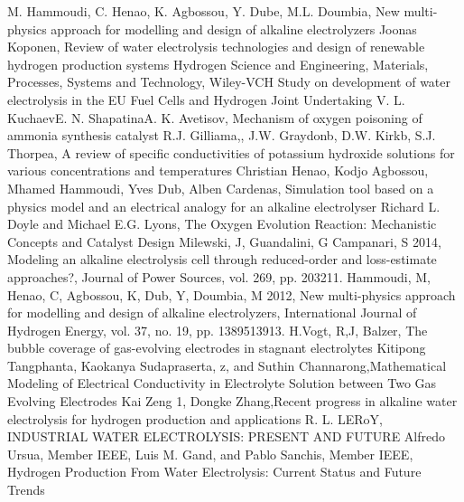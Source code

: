 \documentclass[11pt, a4paper]{article}
\begin{document}
\singlespacing
\begin{thebibliography}{99}
\linespread{1} 
M. Hammoudi, C. Henao, K. Agbossou, Y. Dube, M.L. Doumbia, New multi-physics approach for modelling and design of alkaline electrolyzers
Joonas Koponen, Review of water electrolysis technologies and design of renewable hydrogen production systems
Hydrogen Science and Engineering, Materials, Processes, Systems and Technology, Wiley-VCH
Study on development of water electrolysis in the EU Fuel Cells and Hydrogen Joint Undertaking
V. L. KuchaevE. N. ShapatinaA. K. Avetisov, Mechanism of oxygen poisoning of ammonia synthesis catalyst
R.J. Gilliama,, J.W. Graydonb, D.W. Kirkb, S.J. Thorpea, A review of specific conductivities of potassium hydroxide solutions for various concentrations and temperatures
Christian Henao, Kodjo Agbossou, Mhamed Hammoudi, Yves Dub, Alben Cardenas, Simulation tool based on a physics model and an electrical analogy for an alkaline electrolyser
Richard L. Doyle and Michael E.G. Lyons, The Oxygen Evolution Reaction: Mechanistic Concepts and Catalyst Design
Milewski, J, Guandalini, G  Campanari, S 2014, Modeling an alkaline electrolysis cell through reduced-order and loss-estimate approaches?, Journal of Power Sources, vol. 269, pp. 203211.
Hammoudi, M, Henao, C, Agbossou, K, Dub, Y, Doumbia, M 2012, New multi-physics approach for modelling and design of alkaline electrolyzers, International Journal of Hydrogen Energy, vol. 37, no. 19, pp. 1389513913.
H.Vogt, R,J, Balzer, The bubble coverage of gas-evolving electrodes in stagnant electrolytes
Kitipong Tangphanta, Kaokanya Sudapraserta, z, and Suthin Channarong,Mathematical Modeling of Electrical Conductivity
in Electrolyte Solution between Two Gas Evolving Electrodes
Kai Zeng 1, Dongke Zhang,Recent progress in alkaline water electrolysis for hydrogen production and applications
R. L. LERoY, INDUSTRIAL WATER ELECTROLYSIS: PRESENT AND FUTURE
Alfredo Ursua, Member IEEE, Luis M. Gand, and Pablo Sanchis, Member IEEE, Hydrogen Production From
Water Electrolysis: Current Status and Future Trends

\end{thebibliography}
\end{document}
